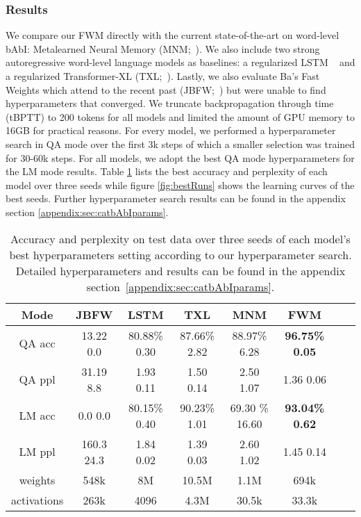 \documentclass{article} \usepackage{iclr2021_conference,times}
\begin{document}
\subsubsection{Results}
We compare our FWM directly with the current state-of-the-art on word-level bAbI: Metalearned Neural Memory (MNM;~\citet{munkhdalai2019metalearned}).
We also include two strong autoregressive word-level language models as baselines: a regularized LSTM ~\citep{merity2018regularizing, lstm_still_sota_melis} and a regularized Transformer-XL (TXL;~\citet{dai2019transformer}). 
Lastly, we also evaluate Ba's Fast Weights which attend to the recent past (JBFW;~\citet{Ba2016using}) but were unable to find hyperparameters that converged.
We truncate backpropagation through time (tBPTT) to 200 tokens for all models and limited the amount of GPU memory to \texttildelow16GB for practical reasons. 
For every model, we performed a hyperparameter search in QA mode over the first 3k steps of which a smaller selection was trained for 30-60k steps. For all models, we adopt the best QA mode hyperparameters for the LM mode results.
Table \ref{tbl:catbAbI} lists the best accuracy and perplexity of each model over three seeds while figure \ref{fig:bestRuns} shows the learning curves of the best seeds.
Further hyperparameter search results can be found in the appendix section \ref{appendix:sec:catbAbIparams}.
\begin{table}[h]
  \vspace{-6pt}
  \caption{
  Accuracy and perplexity on test data over three seeds of each model's best hyperparameters setting according to our hyperparameter search. Detailed hyperparameters and results can be found in the appendix section~\ref{appendix:sec:catbAbIparams}.}
  \vspace{5pt}
  \label{tbl:catbAbI}
  \centering
  \setlength{\tabcolsep}{4pt}
  \renewcommand{\arraystretch}{1}
  \begin{tabular}{cccccccc}
    \toprule
    Mode & JBFW & LSTM & TXL & MNM & FWM \\
    \midrule
QA acc   & 13.22  0.0 & 80.88\%  0.30  & 87.66\%  2.82  & 88.97\%  6.28   & \textbf{96.75\%  0.05} \\
    QA ppl   & 31.19  8.8 & 1.93  0.11     & 1.50  0.14     & 2.50  1.07      & 1.36  0.06 \\
LM acc \rule{0pt}{1.2\normalbaselineskip}
             & 0.0  0.0  & 80.15\%  0.40   & 90.23\%  1.01  & 69.30 \%  16.60 & \textbf{93.04\%  0.62} \\
    LM ppl   & 160.3  24.3& 1.84  0.02     & 1.39  0.03     & 2.60  1.02      & 1.45  0.14 \\
weights \rule{0pt}{1.2\normalbaselineskip}
                & 548k\footnotemark & 8M     & 10.5M & 1.1M  & 694k \\
    activations & 263k   & 4096   & 4.3M\footnotemark & 30.5k & 33.3k \\
    \bottomrule
  \end{tabular}
\end{table}
\end{document}
